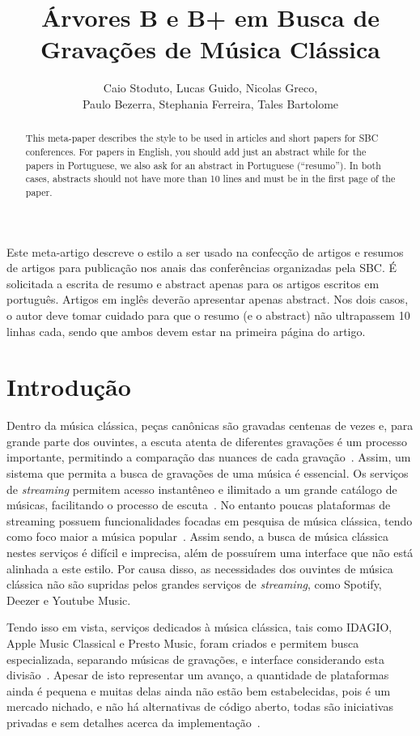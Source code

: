 \documentclass[12pt]{article}
\title{Árvores B e B\nolinebreak+ em Busca de Gravações de Música Clássica\\}
\author{Caio Stoduto\inst{1}, Lucas Guido\inst{1}, Nicolas Greco\inst{1},\\
Paulo Bezerra\inst{1}, Stephania Ferreira\inst{1}, Tales Bartolome\inst{1}}
\begin{document}
 

\maketitle

\begin{abstract}
  This meta-paper describes the style to be used in articles and short papers
  for SBC conferences. For papers in English, you should add just an abstract
  while for the papers in Portuguese, we also ask for an abstract in Portuguese
  (``resumo''). In both cases, abstracts should not have more than 10 lines and
  must be in the first page of the paper.
\end{abstract}
     
\begin{resumo} 
  Este meta-artigo descreve o estilo a ser usado na confecção de artigos e
  resumos de artigos para publicação nos anais das conferências organizadas pela
  SBC. É solicitada a escrita de resumo e abstract apenas para os artigos
  escritos em português. Artigos em inglês deverão apresentar apenas abstract.
  Nos dois casos, o autor deve tomar cuidado para que o resumo (e o abstract)
  não ultrapassem 10 linhas cada, sendo que ambos devem estar na primeira página
  do artigo.
\end{resumo}

\section{Introdução}
Dentro da música clássica, peças canônicas são gravadas centenas de vezes e,
para grande parte dos ouvintes, a escuta atenta de diferentes gravações é um
processo importante, permitindo a comparação das nuances de cada gravação~\cite{Bl:25}.
Assim, um sistema que permita a busca de gravações de uma música é essencial.
Os serviços de \emph{streaming} permitem acesso instantêneo e ilimitado a um
grande catálogo de músicas, facilitando o processo de escuta~\cite{MoVi:18}.
No entanto poucas plataformas de streaming possuem funcionalidades focadas em
pesquisa de música clássica, tendo como foco maior a música popular~\cite{Bl:25}.
Assim sendo, a busca de música clássica nestes serviços é difícil e imprecisa, 
além de possuírem uma interface que não está alinhada a este estilo.
Por causa disso, as necessidades dos ouvintes de música clássica não são supridas
pelos grandes serviços de \emph{streaming}, como Spotify, Deezer e Youtube Music.

Tendo isso em vista, serviços dedicados à música clássica, tais como
IDAGIO, Apple Music Classical e Presto Music, foram criados e permitem busca
especializada, separando músicas de gravações, e interface considerando esta
divisão~\cite{Bl:25}.
Apesar de isto representar um avanço, a quantidade de plataformas ainda é pequena
e muitas delas ainda não estão bem estabelecidas, pois é um mercado nichado, e 
não há alternativas de código aberto, todas são iniciativas privadas e sem
detalhes acerca da implementação~\cite{Bl:25}.
\end{document}
